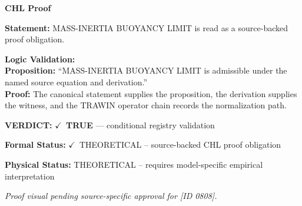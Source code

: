 \vspace{0.45em}
\noindent\textbf{CHL Proof}\par
\textbf{Statement:} MASS-INERTIA BUOYANCY LIMIT is read as a source-backed proof obligation.

\textbf{Logic Validation:}\\
\textbf{Proposition:} ``MASS-INERTIA BUOYANCY LIMIT is admissible under the named source equation and derivation.''\\
\textbf{Proof:} The canonical statement supplies the proposition, the derivation supplies the witness, and the TRAWIN operator chain records the normalization path.

\textbf{VERDICT:} \ensuremath{\checkmark}\ \textbf{TRUE} --- conditional registry validation

\textbf{Formal Status:} \ensuremath{\checkmark}\ THEORETICAL -- source-backed CHL proof obligation

\textbf{Physical Status:} THEORETICAL -- requires model-specific empirical interpretation
\par\vspace{0.45em}
\par
\vfill
\begingroup\footnotesize\itshape
Proof visual pending source-specific approval for [ID 0808].
\par\endgroup
\vfill
\endgroup
\endgroup

